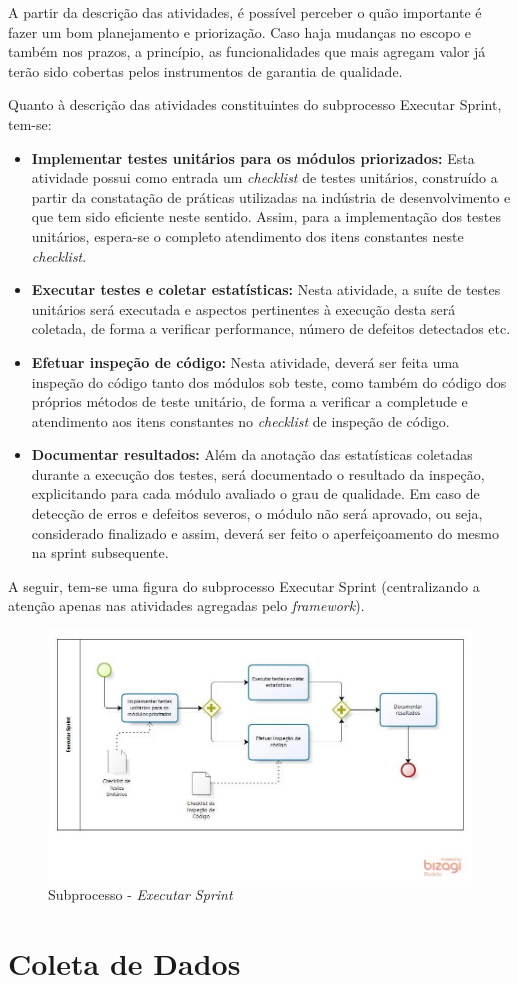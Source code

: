 A partir da descrição das atividades, é possível perceber o quão importante é fazer um bom planejamento e priorização. Caso haja mudanças no escopo e também nos prazos, a princípio, as funcionalidades que mais agregam valor já terão sido cobertas pelos instrumentos de garantia de qualidade.

Quanto à descrição das atividades constituintes do subprocesso Executar Sprint, tem-se:

\begin{itemize}
	\item \textbf{Implementar testes unitários para os módulos priorizados:} Esta atividade possui como entrada um \textit{checklist} de testes unitários, construído a partir da constatação de práticas utilizadas na indústria de desenvolvimento e que tem sido eficiente neste sentido. Assim, para a implementação dos testes unitários, espera-se o completo atendimento dos itens constantes neste \textit{checklist}.

	\item \textbf{Executar testes e coletar estatísticas:} Nesta atividade, a suíte de testes unitários será executada e aspectos pertinentes à execução desta será coletada, de forma a verificar performance, número de defeitos detectados etc.

	\item \textbf{Efetuar inspeção de código:} Nesta atividade, deverá ser feita uma inspeção do código tanto dos módulos sob teste, como também do código dos próprios métodos de teste unitário, de forma a verificar a completude e atendimento aos itens constantes no \textit{checklist} de inspeção de código.

	\item \textbf{Documentar resultados:} Além da anotação das estatísticas coletadas durante a execução dos testes, será documentado o resultado da inspeção, explicitando para cada módulo avaliado o grau de qualidade. Em caso de detecção de erros e defeitos severos, o módulo não será aprovado, ou seja, considerado finalizado e assim, deverá ser feito o aperfeiçoamento do mesmo na sprint subsequente.
\end{itemize}

A seguir, tem-se uma figura do subprocesso Executar Sprint (centralizando a atenção apenas nas atividades agregadas pelo \textit{framework}).

\begin{figure}[h]
\includegraphics[width=\textwidth]{figuras/executarsprint.jpg}
\caption{Subprocesso - \textit{Executar Sprint}}
\end{figure}

\section{Coleta de Dados}